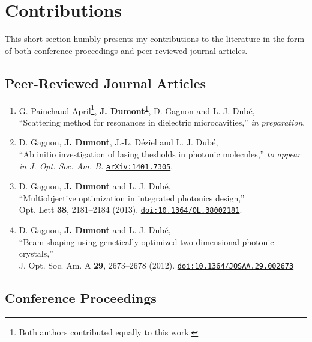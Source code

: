 \chapter*{Contributions}
This short section humbly presents my contributions to the 
literature in the form of both conference proceedings and 
peer-reviewed journal articles. 

\section*{Peer-Reviewed Journal Articles}
\renewcommand*{\thefootnote}{\fnsymbol{footnote}}

\begin{enumerate}
 \item[\cite{GAP2014}] G. Painchaud-April\footnote{\label{note1}Both authors contributed equally to this work.}, 
	\textbf{J. Dumont}\textsuperscript{\ref{note1}}, D. Gagnon and L. J. Dubé,\\ 
	``Scattering method for resonances in dielectric microcavities,'' \textit{in preparation}.
  \item[\cite{GAG2014a}] D. Gagnon, \textbf{J. Dumont}, J.-L. Déziel and L. J. Dubé, \\
	``Ab initio investigation of lasing thesholds in photonic molecules,'' \textit{to appear in J. Opt. Soc. Am. B.}
	\href{http://arxiv.og/abs/1401.7305}{\texttt{arXiv:1401.7305}}.
  \item[\cite{GAG2013c}]D. Gagnon, \textbf{J. Dumont} and L. J. Dubé, \\
	``Multiobjective optimization in integrated photonics design,''\\
	Opt. Lett \textbf{38}, 2181--2184 (2013). 
	\href{http://dx.doi.org/10.1364/OL.38002181}{\texttt{doi:10.1364/OL.38002181}}.
  \item[\cite{GAG2012}]D. Gagnon, \textbf{J. Dumont} and L. J. Dubé, \\
	``Beam shaping using genetically optimized two-dimensional photonic crystals,''\\
	J. Opt. Soc. Am. A \textbf{29}, 2673--2678 (2012). 
	\href{http://dx.doi.org/10.1364/JOSAA.29.002673}{\texttt{doi:10.1364/JOSAA.29.002673}}
\end{enumerate}

\clearpage
\section*{Conference Proceedings}
\renewcommand*{\thefootnote}{\roman{footnote}}
\setcounter{footnote}{0}

